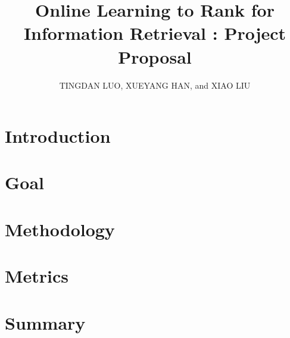 \documentclass[prodmode,acmtap]{acmlarge}
\title{Online Learning to Rank for Information Retrieval : Project Proposal}
\author{TINGDAN LUO, XUEYANG HAN, and XIAO LIU \affil{University of Virginia}
}
\begin{document}
\maketitle

\section{Introduction}

\section{Goal}

\section{Methodology}

\section{Metrics}

\section{Summary}
\end{document}
